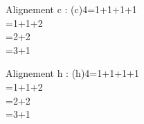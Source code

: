 \documentclass{article}
\begin{document}
Alignement c :
\autoaligne(c){4=1+1+1+1\\=1+1+2\\=2+2\\=3+1}\medbreak

Alignement h :
\autoaligne(h){4=1+1+1+1\\=1+1+2\\=2+2\\=3+1}\medbreak

\end{document}
